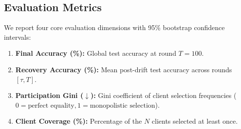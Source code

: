 \documentclass[journal,compsoc]{IEEEtran}
\begin{document}
\subsection{Evaluation Metrics}
We report four core evaluation dimensions with 95\% bootstrap confidence intervals:
\begin{enumerate}
    \item \textbf{Final Accuracy (\%):} Global test accuracy at round $T=100$.
    \item \textbf{Recovery Accuracy (\%):} Mean post-drift test accuracy across rounds $[\tau, T]$.
    \item \textbf{Participation Gini ($\downarrow$):} Gini coefficient of client selection frequencies ($0 = \text{perfect equality}, 1 = \text{monopolistic selection}$).
    \item \textbf{Client Coverage (\%):} Percentage of the $N$ clients selected at least once.
\end{enumerate}
\end{document}
